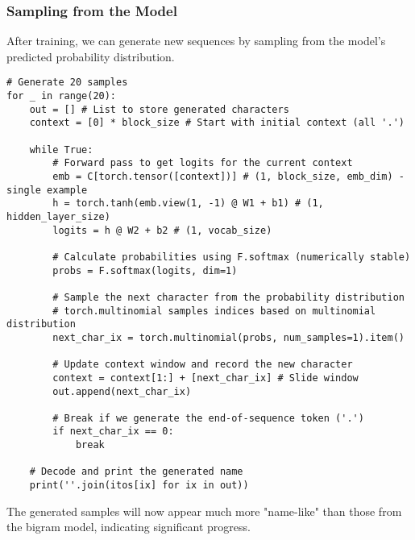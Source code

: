 \subsubsection{Sampling from the Model}
After training, we can generate new sequences by sampling from the model's predicted probability distribution.

\begin{lstlisting}[caption=Generating Samples from the Trained Model]
# Generate 20 samples
for _ in range(20):
    out = [] # List to store generated characters
    context = [0] * block_size # Start with initial context (all '.')

    while True:
        # Forward pass to get logits for the current context
        emb = C[torch.tensor([context])] # (1, block_size, emb_dim) - single example
        h = torch.tanh(emb.view(1, -1) @ W1 + b1) # (1, hidden_layer_size)
        logits = h @ W2 + b2 # (1, vocab_size)

        # Calculate probabilities using F.softmax (numerically stable)
        probs = F.softmax(logits, dim=1)

        # Sample the next character from the probability distribution
        # torch.multinomial samples indices based on multinomial distribution
        next_char_ix = torch.multinomial(probs, num_samples=1).item()

        # Update context window and record the new character
        context = context[1:] + [next_char_ix] # Slide window
        out.append(next_char_ix)

        # Break if we generate the end-of-sequence token ('.')
        if next_char_ix == 0:
            break

    # Decode and print the generated name
    print(''.join(itos[ix] for ix in out))
\end{lstlisting}

The generated samples will now appear much more "name-like" than those from the bigram model, indicating significant progress.


